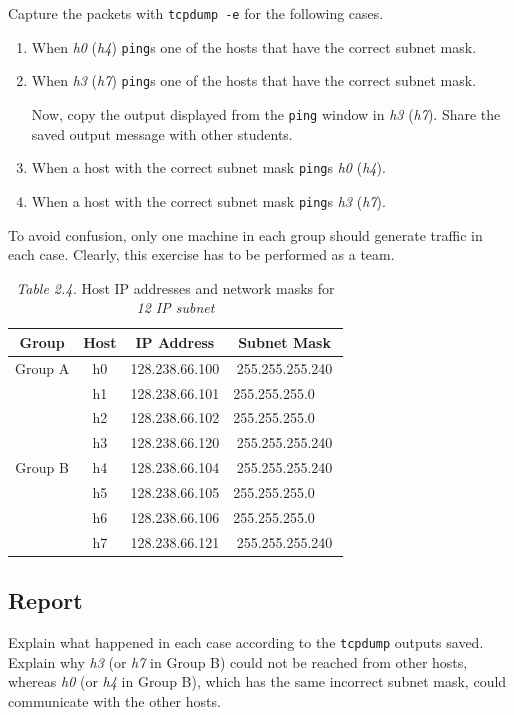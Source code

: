 \documentclass{../UTNetLab}
\begin{document}
    Capture the packets with \lstinline{tcpdump -e} for the following cases.

    \begin{enumerate}
        \item When \textit{h0} (\textit{h4}) \lstinline{ping}s one of the hosts that have the correct subnet mask.
        
        \item When \textit{h3} (\textit{h7}) \lstinline{ping}s one of the hosts that have the correct subnet mask.

        Now, copy the output displayed from the \lstinline{ping} window in \textit{h3} (\textit{h7}).
        Share the saved output message with other students.
        
        \item When a host with the correct subnet mask \lstinline{ping}s \textit{h0} (\textit{h4}).
        
        \item When a host with the correct subnet mask \lstinline{ping}s \textit{h3} (\textit{h7}).
    \end{enumerate}
    
    To avoid confusion, only one machine in each group should generate traffic in each case.
    Clearly, this exercise has to be performed as a team.
    \begin{table}[H]
        \caption{\textit{Table 2.4.} Host IP addresses and network masks for \textit{12 IP subnet}}
        \centering
        \begin{tabular}{ c c c c }
            \hline \hline
            Group & Host & IP Address & Subnet Mask \\
            \hline 
            Group A & h0 & 128.238.66.100 & 255.255.255.240 \\
                    & h1 & 128.238.66.101 & 255.255.255.0~~~ \\
                    & h2 & 128.238.66.102 & 255.255.255.0~~~ \\
                    & h3 & 128.238.66.120 & 255.255.255.240 \\
                    \hline
            Group B & h4 & 128.238.66.104 & 255.255.255.240 \\
                    & h5 & 128.238.66.105 & 255.255.255.0~~~ \\
                    & h6 & 128.238.66.106 & 255.255.255.0~~~ \\
                    & h7 & 128.238.66.121 & 255.255.255.240 \\
            \hline \hline
            \end{tabular}
    \end{table}
    
    \subsection*{Report}
    Explain what happened in each case according to the \lstinline{tcpdump} outputs saved.
    Explain why \textit{h3} (or \textit{h7} in Group B) could not be reached from other hosts, whereas \textit{h0} (or \textit{h4} in Group B), which has the same incorrect subnet mask, could communicate with the other hosts.
\end{document}
